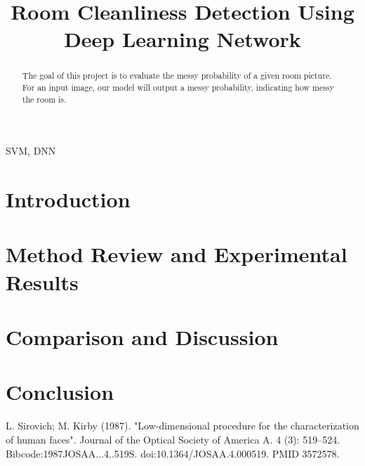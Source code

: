 \documentclass[conference]{IEEEtran}
\begin{document}
\title{Room Cleanliness Detection Using Deep Learning Network}

\author{

}

\maketitle

\begin{abstract}
The goal of this project is to evaluate the messy probability of a given room picture. For an input image, our model will output a messy probability, indicating how messy the room is.
\end{abstract}

\begin{IEEEkeywords}
SVM, DNN
\end{IEEEkeywords}

\section{Introduction}


\section{Method Review and Experimental Results}

\section{Comparison and Discussion}

\section{Conclusion}


\begin{thebibliography}{00}
L. Sirovich; M. Kirby (1987). "Low-dimensional procedure for the characterization of human faces". Journal of the Optical Society of America A. 4 (3): 519–524. Bibcode:1987JOSAA...4..519S. doi:10.1364/JOSAA.4.000519. PMID 3572578.

\end{thebibliography}	
\end{document}
